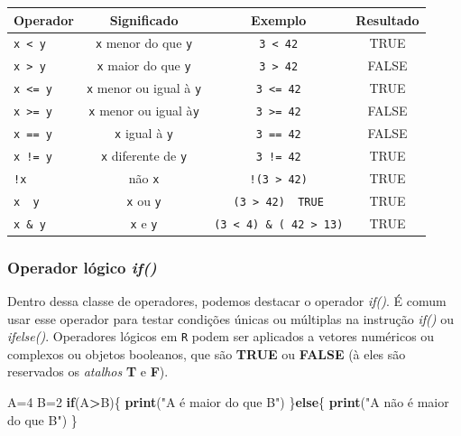 \documentclass[
]{book}
\newenvironment{Shaded}{\begin{snugshade}}{\end{snugshade}}
\newcommand{\ControlFlowTok}[1]{\textcolor[rgb]{0.13,0.29,0.53}{\textbf{#1}}}
\newcommand{\DecValTok}[1]{\textcolor[rgb]{0.00,0.00,0.81}{#1}}
\newcommand{\KeywordTok}[1]{\textcolor[rgb]{0.13,0.29,0.53}{\textbf{#1}}}
\newcommand{\NormalTok}[1]{#1}
\newcommand{\OperatorTok}[1]{\textcolor[rgb]{0.81,0.36,0.00}{\textbf{#1}}}
\newcommand{\StringTok}[1]{\textcolor[rgb]{0.31,0.60,0.02}{#1}}
\theoremstyle{definition}
\theoremstyle{definition}
\theoremstyle{definition}
\theoremstyle{remark}
\begin{document}
\begin{longtable}[]{@{}lccc@{}}
\toprule
Operador & Significado & Exemplo & Resultado\tabularnewline
\midrule
\endhead
\texttt{x\ \textless{}\ y} & \texttt{x} menor do que \texttt{y} & \texttt{3\ \textless{}\ 42} & TRUE\tabularnewline
\texttt{x\ \textgreater{}\ y} & \texttt{x} maior do que \texttt{y} & \texttt{3\ \textgreater{}\ 42} & FALSE\tabularnewline
\texttt{x\ \textless{}=\ y} & \texttt{x} menor ou igual à \texttt{y} & \texttt{3\ \textless{}=\ 42} & TRUE\tabularnewline
\texttt{x\ \textgreater{}=\ y} & \texttt{x} menor ou igual à\texttt{y} & \texttt{3\ \textgreater{}=\ 42} & FALSE\tabularnewline
\texttt{x\ ==\ y} & \texttt{x} igual à \texttt{y} & \texttt{3\ ==\ 42} & FALSE\tabularnewline
\texttt{x\ !=\ y} & \texttt{x} diferente de \texttt{y} & \texttt{3\ !=\ 42} & TRUE\tabularnewline
\texttt{!x} & não \texttt{x} & \texttt{!(3\ \textgreater{}\ 42)} & TRUE\tabularnewline
\texttt{x\ \textbar{}\ y} & \texttt{x} ou \texttt{y} & \texttt{(3\ \textgreater{}\ 42)\ \textbar{}\ TRUE} & TRUE\tabularnewline
\texttt{x\ \&\ y} & \texttt{x} e \texttt{y} & \texttt{(3\ \textless{}\ 4)\ \&\ (\ 42\ \textgreater{}\ 13)} & TRUE\tabularnewline
\bottomrule
\end{longtable}

\hypertarget{operador-luxf3gico-if}{%
\subsubsection{\texorpdfstring{Operador lógico \emph{if()}}{Operador lógico if()}}\label{operador-luxf3gico-if}}

Dentro dessa classe de operadores, podemos destacar o operador \emph{if()}. É comum usar esse operador para testar condições únicas ou múltiplas na instrução \emph{if()} ou \emph{ifelse()}. Operadores lógicos em \texttt{R} podem ser aplicados a vetores numéricos ou complexos ou objetos booleanos, que são \textbf{TRUE} ou \textbf{FALSE} (à eles são reservados os \emph{atalhos} \textbf{T} e \textbf{F}).

\begin{Shaded}
\begin{Highlighting}[]
\NormalTok{A=}\DecValTok{4}
\NormalTok{B=}\DecValTok{2}
\ControlFlowTok{if}\NormalTok{(A}\OperatorTok{>}\NormalTok{B)\{}
  \KeywordTok{print}\NormalTok{(}\StringTok{"A é maior do que B"}\NormalTok{)}
\NormalTok{  \}}\ControlFlowTok{else}\NormalTok{\{}
    \KeywordTok{print}\NormalTok{(}\StringTok{"A não é maior do que B"}\NormalTok{)}
\NormalTok{  \}}
\end{Highlighting}
\end{Shaded}
\end{document}
